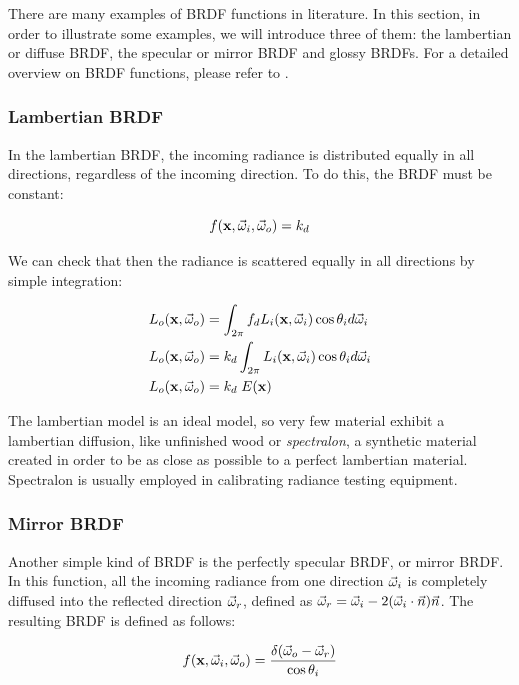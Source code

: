 There are many examples of BRDF functions in literature. In this section, in order to illustrate some examples, we will introduce three of them: the lambertian or diffuse BRDF, the specular or mirror BRDF and glossy BRDFs. For a detailed overview on BRDF functions, please refer to \citep{RTR3}.

\subsubsection{Lambertian BRDF}

In the lambertian BRDF, the incoming radiance is distributed equally in all directions, regardless of the incoming direction. To do this, the BRDF must be constant:

$$
f(\mathbf{x}, \vec{\omega}_i, \vec{\omega}_o) = k_d
$$

We can check that then the radiance is scattered equally in all directions by simple integration:

\begin{equation*}
\begin{split}
L_o(\mathbf{x}, \vec{\omega}_o) &= \int_{2\pi} f_d L_i(\mathbf{x}, \vec{\omega}_i) \cos\theta_i d\vec{\omega}_i \\
L_o(\mathbf{x}, \vec{\omega}_o) &= k_d \int_{2\pi} L_i(\mathbf{x}, \vec{\omega}_i) \cos\theta_i d\vec{\omega}_i \\
L_o(\mathbf{x}, \vec{\omega}_o) &= k_d \; E(\mathbf{x}) \\
\end{split}
\end{equation*}

The lambertian model is an ideal model, so very few material exhibit a lambertian diffusion, like unfinished wood or \emph{spectralon}, a synthetic material created in order to be as close as possible to a perfect lambertian material. Spectralon is usually employed in calibrating radiance testing equipment. 

\subsubsection{Mirror BRDF}

Another simple kind of BRDF is the perfectly specular BRDF, or mirror BRDF. In this function, all the incoming radiance from one direction $\vec{\omega}_i$ is completely diffused into the reflected direction $\vec{\omega}_r$, defined as $\vec{\omega}_r = \vec{\omega}_i - 2 (\vec{\omega}_i \cdot \vec{n}) \vec{n}$. The resulting BRDF is defined as follows:

$$
f(\mathbf{x}, \vec{\omega}_i, \vec{\omega}_o) = \frac{\delta(\vec{\omega}_o - \vec{\omega}_r)}{\cos\theta_i} 
$$

